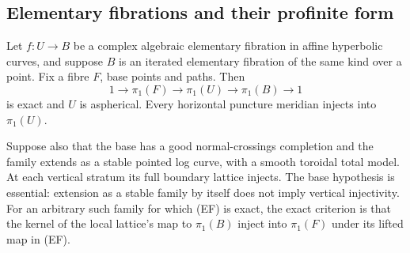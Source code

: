 \subsection{Elementary fibrations and their profinite form}

\begin{theorem}\label{P3b-discrete}
Let $f:U\to B$ be a complex algebraic elementary fibration in affine
hyperbolic curves, and suppose $B$ is an iterated elementary fibration of the
same kind over a point.  Fix a fibre $F$, base points and paths.  Then
\[
 1\longrightarrow\pi_1(F)\longrightarrow\pi_1(U)
 \longrightarrow\pi_1(B)\longrightarrow1                  \tag{EF}
\]
is exact and $U$ is aspherical.  Every horizontal puncture meridian injects
into $\pi_1(U)$.

Suppose also that the base has a good normal-crossings completion and the
family extends as a stable pointed log curve, with a smooth toroidal total
model.  At each vertical stratum its full boundary lattice injects.
The base hypothesis is essential: extension as a stable family by itself does
not imply vertical injectivity.  For an arbitrary such family for which (EF)
is exact, the exact criterion is that the kernel of the local lattice's map
to $\pi_1(B)$ inject into $\pi_1(F)$ under its lifted map in (EF).
\end{theorem}
